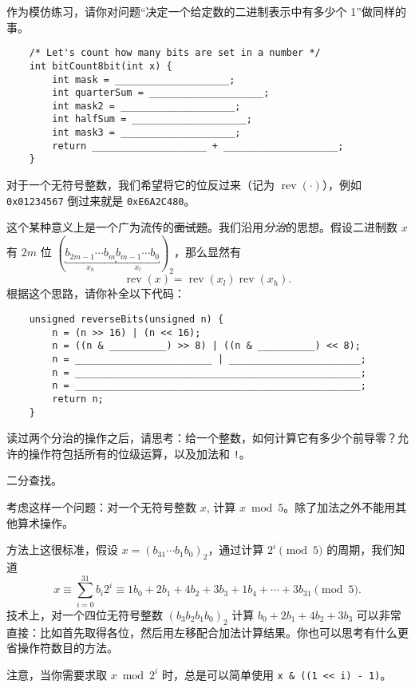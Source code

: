 \begin{example}[计数]
        作为模仿练习，请你对问题“决定一个给定数的二进制表示中有多少个 1”做同样的事。
        \begin{verbatim}
    /* Let's count how many bits are set in a number */
    int bitCount8bit(int x) {
        int mask = ____________________;
        int quarterSum = ____________________;
        int mask2 = ____________________;
        int halfSum = ____________________;
        int mask3 = ____________________;
        return ____________________ + ____________________;
    }
        \end{verbatim}
    \end{example}

    \begin{example}[模拟操作 2]
        对于一个无符号整数，我们希望将它的位反过来（记为 $\operatorname{rev}(\cdot)$），例如 \texttt{0x01234567} 倒过来就是 \texttt{0xE6A2C480}。

        这个某种意义上是一个广为流传的\sout{面试题}。我们沿用\emph{分治}的思想。假设二进制数 $x$ 有 $2m$ 位 $(\underbracket{b_{2m-1} \dotsm b_m}_{x_h} \underbracket{b_{m-1} \dotsm b_0}_{x_l})_2$，那么显然有
        \[ \operatorname{rev}(x) = \operatorname{rev}(x_l) \operatorname{rev}(x_h). \]
        根据这个思路，请你补全以下代码：
        \begin{verbatim}
    unsigned reverseBits(unsigned n) {
        n = (n >> 16) | (n << 16);
        n = ((n & __________) >> 8) | ((n & __________) << 8);
        n = ________________________ | _______________________;
        n = __________________________________________________;
        n = __________________________________________________;
        return n;
    }
        \end{verbatim}

        读过两个分治的操作之后，请思考：给一个整数，如何计算它有多少个前导零？允许的操作符包括所有的位级运算，以及加法和 \texttt{!}。\begin{hint} 二分查找。 \end{hint}
    \end{example}

    \begin{example}[算术运算]
        考虑这样一个问题：对一个无符号整数 $x$, 计算 $x \bmod 5$。除了加法之外不能用其他算术操作。

        方法上这很标准，假设 $x=(b_{31} \dotsm b_1b_0)_2$，通过计算 $2^i \pmod 5$ 的周期，我们知道
        \[ x \equiv \sum_{i=0}^{31} b_i2^i \equiv 1b_0+2b_1+4b_2+3b_3+1b_4 + \dotsb + 3b_{31} \pmod 5. \]
        技术上，对一个四位无符号整数 $(b_3b_2b_1b_0)_2$ 计算 $b_0+2b_1+4b_2+3b_3$ 可以非常直接：比如首先取得各位，然后用左移配合加法计算结果。你也可以思考有什么更省操作符数目的方法。

        注意，当你需要求取 $x \bmod 2^i$ 时，总是可以简单使用 \verb|x & ((1 << i) - 1)|。
    \end{example}